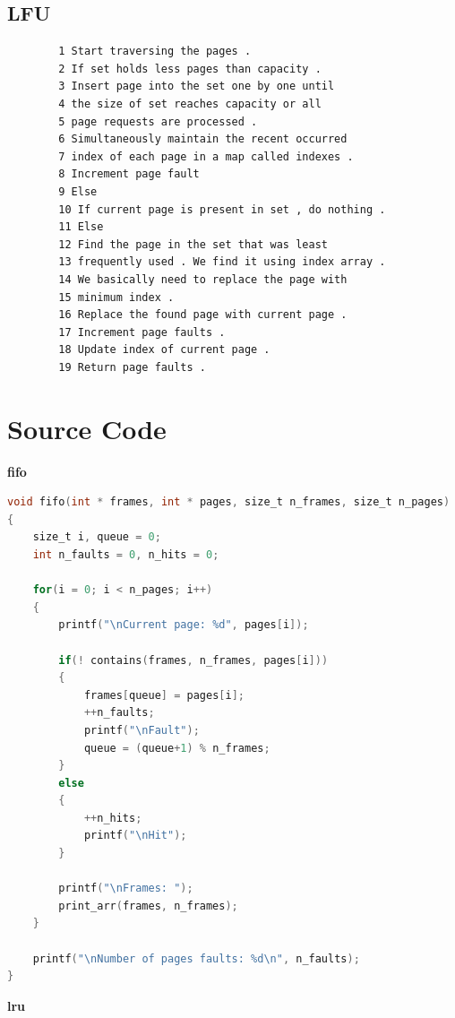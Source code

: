 \documentclass[13pt,oneside]{book}
\begin{document}
    \subsection*{LFU}
    \begin{verbatim}
        1 Start traversing the pages .
		2 If set holds less pages than capacity .
		3 Insert page into the set one by one until
		4 the size of set reaches capacity or all
		5 page requests are processed .
		6 Simultaneously maintain the recent occurred
		7 index of each page in a map called indexes .
		8 Increment page fault
		9 Else
		10 If current page is present in set , do nothing .
		11 Else
		12 Find the page in the set that was least
		13 frequently used . We find it using index array .
		14 We basically need to replace the page with
		15 minimum index .
		16 Replace the found page with current page .
		17 Increment page faults .
		18 Update index of current page .
		19 Return page faults .
    \end{verbatim}  
    
    \section*{Source Code}
    \Large\textbf{fifo}
\small

\begin{lstlisting}[language=C]
void fifo(int * frames, int * pages, size_t n_frames, size_t n_pages)
{
	size_t i, queue = 0;
	int n_faults = 0, n_hits = 0;

	for(i = 0; i < n_pages; i++)
	{
		printf("\nCurrent page: %d", pages[i]);

		if(! contains(frames, n_frames, pages[i]))
		{
			frames[queue] = pages[i];
			++n_faults;
			printf("\nFault");
			queue = (queue+1) % n_frames;
		}
		else
		{
			++n_hits;
			printf("\nHit");
		}
		
		printf("\nFrames: ");
		print_arr(frames, n_frames);
	}

	printf("\nNumber of pages faults: %d\n", n_faults);
}
    \end{lstlisting}
    
        \Large\textbf{lru}
\small
\end{document}
